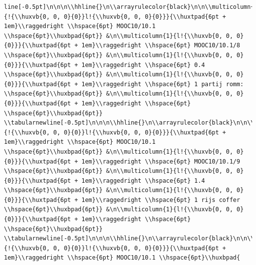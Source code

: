 \documentclass[11pt,preprint, authoryear]{elsarticle}
\numberwithin{equation}{section}
\numberwithin{figure}{section}
\numberwithin{table}{section}
\begin{document}
\begin{verbatim}
line[-0.5pt]\n\n\n\\hhline{}\n\\arrayrulecolor{black}\n\n\\multicolumn{1}{!{\\huxvb{0, 0, 0}{0}}l!{\\huxvb{0, 0, 0}{0}}}{\\huxtpad{6pt + 1em}\\raggedright \\hspace{6pt} MOOC10/10.1 \\hspace{6pt}\\huxbpad{6pt}} &\n\\multicolumn{1}{l!{\\huxvb{0, 0, 0}{0}}}{\\huxtpad{6pt + 1em}\\raggedright \\hspace{6pt} MOOC10/10.1/8 \\hspace{6pt}\\huxbpad{6pt}} &\n\\multicolumn{1}{l!{\\huxvb{0, 0, 0}{0}}}{\\huxtpad{6pt + 1em}\\raggedright \\hspace{6pt} 0.4 \\hspace{6pt}\\huxbpad{6pt}} &\n\\multicolumn{1}{l!{\\huxvb{0, 0, 0}{0}}}{\\huxtpad{6pt + 1em}\\raggedright \\hspace{6pt} 1 partij romm: \\hspace{6pt}\\huxbpad{6pt}} &\n\\multicolumn{1}{l!{\\huxvb{0, 0, 0}{0}}}{\\huxtpad{6pt + 1em}\\raggedright \\hspace{6pt}  \\hspace{6pt}\\huxbpad{6pt}} \\tabularnewline[-0.5pt]\n\n\n\\hhline{}\n\\arrayrulecolor{black}\n\n\\multicolumn{1}{!{\\huxvb{0, 0, 0}{0}}l!{\\huxvb{0, 0, 0}{0}}}{\\huxtpad{6pt + 1em}\\raggedright \\hspace{6pt} MOOC10/10.1 \\hspace{6pt}\\huxbpad{6pt}} &\n\\multicolumn{1}{l!{\\huxvb{0, 0, 0}{0}}}{\\huxtpad{6pt + 1em}\\raggedright \\hspace{6pt} MOOC10/10.1/9 \\hspace{6pt}\\huxbpad{6pt}} &\n\\multicolumn{1}{l!{\\huxvb{0, 0, 0}{0}}}{\\huxtpad{6pt + 1em}\\raggedright \\hspace{6pt} 1.4 \\hspace{6pt}\\huxbpad{6pt}} &\n\\multicolumn{1}{l!{\\huxvb{0, 0, 0}{0}}}{\\huxtpad{6pt + 1em}\\raggedright \\hspace{6pt} 1 rijs coffer \\hspace{6pt}\\huxbpad{6pt}} &\n\\multicolumn{1}{l!{\\huxvb{0, 0, 0}{0}}}{\\huxtpad{6pt + 1em}\\raggedright \\hspace{6pt}  \\hspace{6pt}\\huxbpad{6pt}} \\tabularnewline[-0.5pt]\n\n\n\\hhline{}\n\\arrayrulecolor{black}\n\n\\multicolumn{1}{!{\\huxvb{0, 0, 0}{0}}l!{\\huxvb{0, 0, 0}{0}}}{\\huxtpad{6pt + 1em}\\raggedright \\hspace{6pt} MOOC10/10.1 \\hspace{6pt}\\huxbpad{
\end{verbatim}
\end{document}
